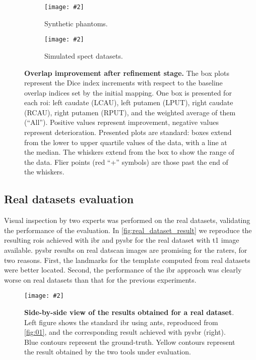 \documentclass{frontiers}
\newcommand{\insertgraphic}[2]{\texttt{[image: \#2]}}
\newcommand{\cbstart}{\relax}
\newcommand{\cbend}{\relax}
\newcommand{\insertgraphic}[2]{\texttt{[image: \#2]}}
\begin{document}
\begin{figure*}[ht]
\centering 
\begin{subfigure}[b]{0.61\linewidth}
\insertgraphic{width=1.0\linewidth}{figures/05-results-phantoms}
\caption{\label{fig:results_a}
Synthetic phantoms.}
\end{subfigure}
\hfill
\begin{subfigure}[b]{0.33\linewidth}
\insertgraphic{width=1.0\linewidth}{figures/05-results-simulated}
\caption{\label{fig:results_b}
Simulated \gls*{spect} datasets.}
\end{subfigure}

\caption{\label{fig:results}
\textbf{Overlap improvement after refinement stage.}
The box plots represent the Dice index increments with respect to the baseline overlap
  indices set by the initial mapping. One box is presented for each \gls*{roi}:
  left caudate (LCAU), left putamen (LPUT), right caudate (RCAU), right putamen (RPUT),
  and the weighted average of them (``All''). Positive values represent improvement,
  negative values represent deterioration.
Presented plots are standard: boxes extend from the lower to upper quartile values
  of the data, with a line at the median. The whiskers extend from the box to show
  the range of the data. Flier points (red ``+'' symbols) are those past the end of
  the whiskers.
}
\end{figure*}

\subsection{Real datasets evaluation}
\label{sec:results_real}
\cbstart
Visual inspection by two experts was performed on the real datasets,
  validating the performance of the evaluation.
In \autoref{fig:real_dataset_result} we reproduce the resulting \glspl*{roi} achieved
  with \gls*{ibr} and \gls*{pysbr} for the real dataset with \gls*{t1} image
  available.
\Gls*{pysbr} results on real \gls*{datscan} images are promising for the raters,
  for two reasons.
\cbend
First, the landmarks for the template computed from real datasets were 
  better located.
Second, the performance of the \gls*{ibr} approach was clearly worse on
  real datasets than that for the previous experiments.

\begin{figure}
\centering 
\insertgraphic{width=1.0\linewidth}{figures/06-results-mri-pysbr}
\caption{ \label{fig:real_dataset_result} 
  \textbf{Side-by-side view of the results obtained for a real dataset}.
  Left figure shows the standard \gls*{ibr} using \gls*{ants}, reproduced from
  \autoref{fig:01}, and the corresponding result achieved with \gls*{pysbr}
  (right). Blue contours represent the ground-truth. Yellow contours represent
  the result obtained by the two tools under evaluation.
}
\end{figure}
\end{document}
